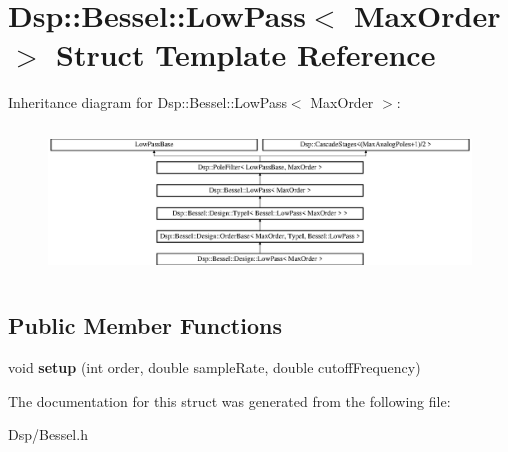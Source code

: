 \hypertarget{structDsp_1_1Bessel_1_1LowPass}{\section{Dsp\-:\-:Bessel\-:\-:Low\-Pass$<$ Max\-Order $>$ Struct Template Reference}
\label{structDsp_1_1Bessel_1_1LowPass}
}
Inheritance diagram for Dsp\-:\-:Bessel\-:\-:Low\-Pass$<$ Max\-Order $>$\-:\begin{figure}[H]
\begin{center}
\leavevmode
\includegraphics[height=3.981043cm]{structDsp_1_1Bessel_1_1LowPass}
\end{center}
\end{figure}
\subsection*{Public Member Functions}
\begin{DoxyCompactItemize}
\item 
\hypertarget{structDsp_1_1Bessel_1_1LowPass_abebab3c5a4fe66deb7d02084d3a434a9}{void {\bfseries setup} (int order, double sample\-Rate, double cutoff\-Frequency)}\label{structDsp_1_1Bessel_1_1LowPass_abebab3c5a4fe66deb7d02084d3a434a9}

\end{DoxyCompactItemize}


The documentation for this struct was generated from the following file\-:\begin{DoxyCompactItemize}
\item 
Dsp/Bessel.\-h\end{DoxyCompactItemize}
